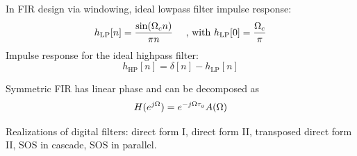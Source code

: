 In FIR design via windowing, ideal lowpass filter impulse response:
\begin{equation}
h_{\textrm{LP}}[n] = \frac{\sin({\Omega}_c n)}{\pi n} \textrm{~~~~, with~} h_{\textrm{LP}}[0]  = \frac{{\Omega}_c}{\pi}
\label{eq:idealLowpass}
\end{equation}
Impulse response for the ideal highpass filter:
\begin{equation}
h_{\textrm{HP}}[n] = \delta[n] - h_{\textrm{LP}}[n]
\label{eq:idealHigpass}
\end{equation}


Symmetric FIR has linear phase and can be decomposed as
\[
H(e^{j{\Omega}}) = e^{-j {\Omega} \tau_g} A({\Omega})
\]

Realizations of digital filters: direct form I, direct form II, transposed direct form II, SOS in cascade, SOS in parallel.